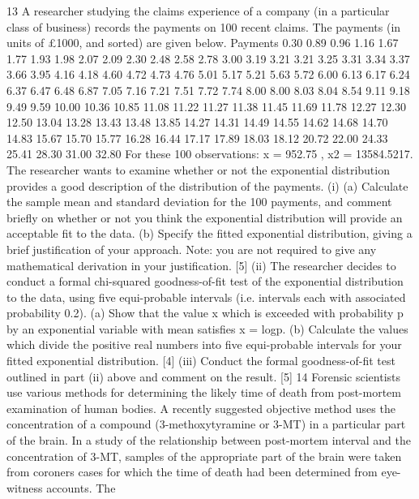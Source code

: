 
13 A researcher studying the claims experience of a company (in a particular class of
business) records the payments on 100 recent claims. The payments (in units of
£1000, and sorted) are given below.
Payments
0.30 0.89 0.96 1.16 1.67 1.77 1.93 1.98 2.07 2.09 2.30 2.48
2.58 2.78 3.00 3.19 3.21 3.21 3.25 3.31 3.34 3.37 3.66 3.95
4.16 4.18 4.60 4.72 4.73 4.76 5.01 5.17 5.21 5.63 5.72 6.00
6.13 6.17 6.24 6.37 6.47 6.48 6.87 7.05 7.16 7.21 7.51 7.72
7.74 8.00 8.00 8.03 8.04 8.54 9.11 9.18 9.49 9.59 10.00 10.36
10.85 11.08 11.22 11.27 11.38 11.45 11.69 11.78 12.27 12.30 12.50 13.04
13.28 13.43 13.48 13.85 14.27 14.31 14.49 14.55 14.62 14.68 14.70 14.83
15.67 15.70 15.77 16.28 16.44 17.17 17.89 18.03 18.12 20.72 22.00 24.33
25.41 28.30 31.00 32.80
For these 100 observations: x = 952.75 , x2 = 13584.5217.
The researcher wants to examine whether or not the exponential distribution provides
a good description of the distribution of the payments.
(i) (a) Calculate the sample mean and standard deviation for the 100
payments, and comment briefly on whether or not you think the
exponential distribution will provide an acceptable fit to the data.
(b) Specify the fitted exponential distribution, giving a brief justification
of your approach.
Note: you are not required to give any mathematical derivation in your
justification.
[5]
(ii) The researcher decides to conduct a formal chi-squared goodness-of-fit test of
the exponential distribution to the data, using five equi-probable intervals
(i.e. intervals each with associated probability 0.2).
(a) Show that the value x which is exceeded with probability p by an
exponential variable with mean satisfies x = logp.
(b) Calculate the values which divide the positive real numbers into five
equi-probable intervals for your fitted exponential distribution.
[4]
(iii) Conduct the formal goodness-of-fit test outlined in part (ii) above and
comment on the result. [5]
14 Forensic scientists use various methods for determining the likely time of death from
post-mortem examination of human bodies. A recently suggested objective method
uses the concentration of a compound (3-methoxytyramine or 3-MT) in a particular
part of the brain.
In a study of the relationship between post-mortem interval and the concentration of
3-MT, samples of the appropriate part of the brain were taken from coroners cases
for which the time of death had been determined from eye-witness accounts. The
